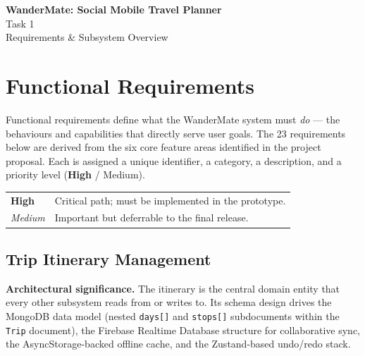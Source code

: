 \documentclass[12pt, a4paper]{article}
\newcommand{\high}{\textbf{High}}
\newcommand{\medium}{Medium}
\begin{document}
\thispagestyle{empty}

\begin{center}
  {\LARGE\bfseries WanderMate: Social Mobile Travel Planner}\\[0.8em]
  {\large Task 1}\\[0.4em]
  {\large Requirements \& Subsystem Overview}
\end{center}

\tableofcontents
\newpage

\section{Functional Requirements}

Functional requirements define what the WanderMate system must \emph{do} --- the behaviours and capabilities that directly serve user goals. The 23 requirements below are derived from the six core feature areas identified in the project proposal. Each is assigned a unique identifier, a category, a description, and a priority level (\high{} / \medium).

\noindent
\begin{tabular}{ll}
  \textbf{High}   & Critical path; must be implemented in the prototype. \\
  \textit{Medium} & Important but deferrable to the final release.        \\
\end{tabular}

\subsection{Trip Itinerary Management}

\begin{tcolorbox}[notebox]
  \textbf{Architectural significance.} The itinerary is the central domain entity that every other subsystem reads from or writes to. Its schema design drives the MongoDB data model (nested \texttt{days[]} and \texttt{stops[]} subdocuments within the \texttt{Trip} document), the Firebase Realtime Database structure for collaborative sync, the AsyncStorage-backed offline cache, and the Zustand-based undo/redo stack.
\end{tcolorbox}
\end{document}
